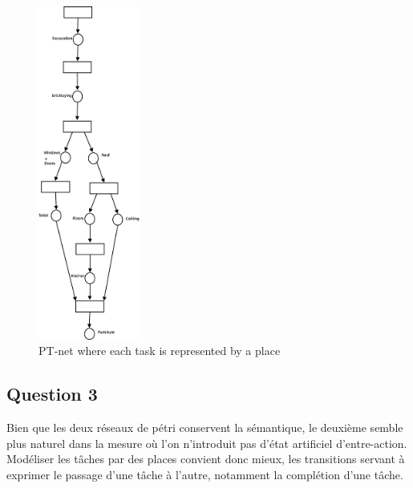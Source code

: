 \begin{figure}[h!]
\begin{center}
\includegraphics[height = 11cm]{exo42.eps} 
\caption{PT-net where each task is represented by a place}
\end{center} 

\end{figure}
\subsection*{Question 3}

Bien que les deux réseaux de pétri conservent la sémantique, le
deuxième semble plus naturel dans la mesure où l'on n'introduit pas
d'état artificiel d'entre-action. Modéliser les tâches par des places
convient donc mieux, les transitions servant à exprimer le passage
d'une tâche à l'autre, notamment la complétion d'une tâche.
